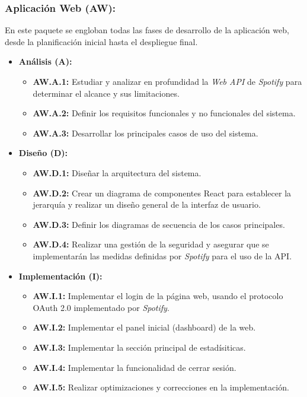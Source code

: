 \subsubsection{Aplicación Web (AW):}

En este paquete se engloban todas las fases de desarrollo de la aplicación web, desde la planificación inicial hasta el despliegue final.

\begin{itemize}
    \item \textbf{Análisis (A):}
          \begin{itemize}
              \item \textbf{AW.A.1:} Estudiar y analizar en profundidad la \textit{Web API} de \textit{Spotify} para determinar el alcance y sus limitaciones.
              \item \textbf{AW.A.2:} Definir los requisitos funcionales y no funcionales del sistema.
              \item \textbf{AW.A.3:} Desarrollar los principales casos de uso del sistema.
          \end{itemize}

    \item \textbf{Diseño (D):}
          \begin{itemize}
              \item \textbf{AW.D.1:} Diseñar la arquitectura del sistema.
              \item \textbf{AW.D.2:} Crear un diagrama de componentes React para establecer la jerarquía y realizar un diseño general de la interfaz de usuario.
              \item \textbf{AW.D.3:} Definir los diagramas de secuencia de los casos principales.
              \item \textbf{AW.D.4:} Realizar una gestión de la seguridad y asegurar que se implementarán las medidas definidas por \textit{Spotify} para el uso de la API.
          \end{itemize}

    \item \textbf{Implementación (I):}
          \begin{itemize}
              \item \textbf{AW.I.1:} Implementar el login de la página web, usando el protocolo OAuth 2.0 implementado por \textit{Spotify}.
              \item \textbf{AW.I.2:} Implementar el panel inicial (dashboard) de la web.
              \item \textbf{AW.I.3:} Implementar la sección principal de estadísiticas.
              \item \textbf{AW.I.4:} Implementar la funcionalidad de cerrar sesión.
              \item \textbf{AW.I.5:} Realizar optimizaciones y correcciones en la implementación.
          \end{itemize}


\end{itemize}
